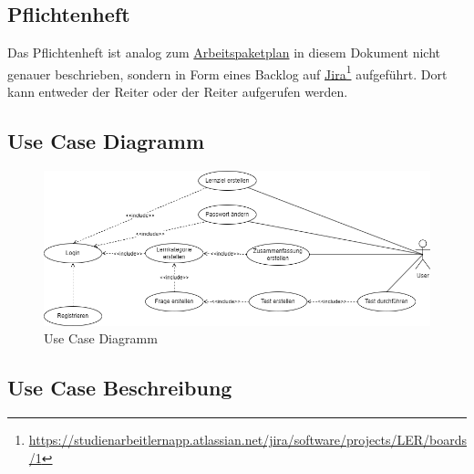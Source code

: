 \subsection{Pflichtenheft}
Das Pflichtenheft ist analog zum
\hyperref[sec:arbeitspaketplan]{Arbeitspaketplan} in diesem Dokument nicht
genauer beschrieben, sondern in Form eines Backlog auf
\href{https://studienarbeitlernapp.atlassian.net/jira/software/projects/LER/boards/1}{\underline{Jira}}\footnote{\href{https://studienarbeitlernapp.atlassian.net/jira/software/projects/LER/boards/1}{https://studienarbeitlernapp.atlassian.net/jira/software/projects/LER/boards/1}}
aufgeführt. Dort kann entweder der Reiter  oder der Reiter
 aufgerufen werden.

\subsection{Use Case Diagramm}

\begin{figure}[H]
  \centering
  \includegraphics[width=1\textwidth]{images/diagramme/UseCase_Diagramm.png}
  \caption{Use Case Diagramm}
  \label{fig:UseCaseDiagramm}
\end{figure}
\newpage
\subsection{Use Case Beschreibung}

